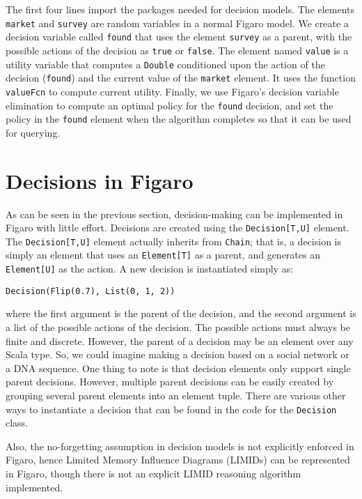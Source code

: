 The first four lines import the packages needed for decision models. The elements \texttt{market} and \texttt{survey} are random variables in a normal Figaro model. We create a decision variable called \texttt{found} that uses the element \texttt{survey} as a parent, with the possible actions of the decision as \texttt{true} or \texttt{false}. The element named \texttt{value} is a utility variable that computes a \texttt{Double} conditioned upon the action of the decision (\texttt{found}) and the current value of the \texttt{market} element. It uses the function \texttt{valueFcn} to compute current utility. Finally, we use Figaro's decision variable elimination to compute an optimal policy for the \texttt{found} decision, and set the policy in the \texttt{found} element when the algorithm completes so that it can be used for querying.

\section{Decisions in Figaro}

As can be seen in the previous section, decision-making can be implemented in Figaro with little effort. Decisions are created using the \texttt{Decision[T,U]} element. The \texttt{Decision[T,U]} element actually inherits from \texttt{Chain}; that is, a decision is simply an element that uses an \texttt{Element[T]} as a parent, and generates an \texttt{Element[U]} as the action. A new decision is instantiated simply as:

\begin{flushleft}
\texttt{Decision(Flip(0.7), List(0, 1, 2))}
\end{flushleft}

where the first argument is the parent of the decision, and the second argument is a list of the possible actions of the decision. The possible actions must always be finite and discrete. However, the parent of a decision may be an element over any Scala type. So, we could imagine making a decision based on a social network or a DNA sequence. One thing to note is that decision elements only support single parent decisions. However, multiple parent decisions can be easily created by grouping several parent elements into an element tuple. There are various other ways to instantiate a decision that can be found in the code for the \texttt{Decision} class.

Also, the no-forgetting assumption in decision models is not explicitly enforced in Figaro, hence Limited Memory Influence Diagrams (LIMIDs) can be represented in Figaro, though there is not an explicit LIMID reasoning algorithm implemented.


